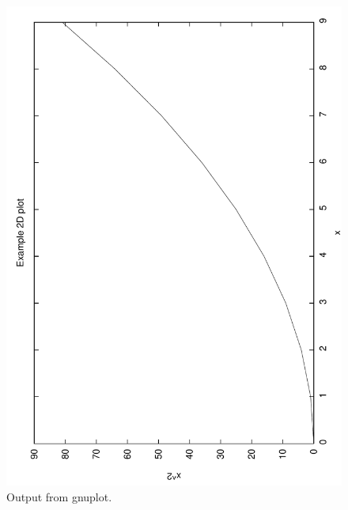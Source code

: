 \ifpdf
\begin{figure}
\centerline{%
\includegraphics[width=\figwidth]{figures/plotExampleGnuplot}%
}
\caption{Output from gnuplot.}
\end{figure}
\else
